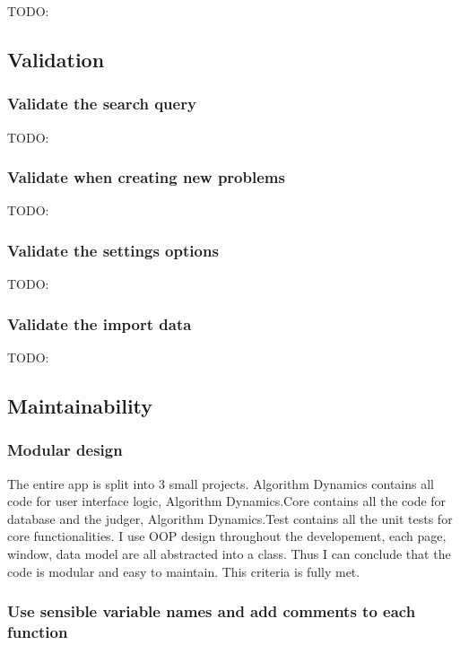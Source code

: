 \documentclass[a4paper]{report}
\begin{document}
TODO:

\subsection{Validation}

\subsubsection{Validate the search query}

TODO:

\subsubsection{Validate when creating new problems}

TODO:

\subsubsection{Validate the settings options}

TODO:

\subsubsection{Validate the import data}

TODO:

\subsection{Maintainability}

\subsubsection{Modular design}

The entire app is split into 3 small projects. Algorithm Dynamics contains all code for user interface logic, Algorithm Dynamics.Core contains all the code for database and the judger, Algorithm Dynamics.Test contains all the unit tests for core functionalities. I use OOP design throughout the developement, each page, window, data model are all abstracted into a class. Thus I can conclude that the code is modular and easy to maintain. This criteria is fully met.

\subsubsection{Use sensible variable
names and add comments to each function}
\end{document}
